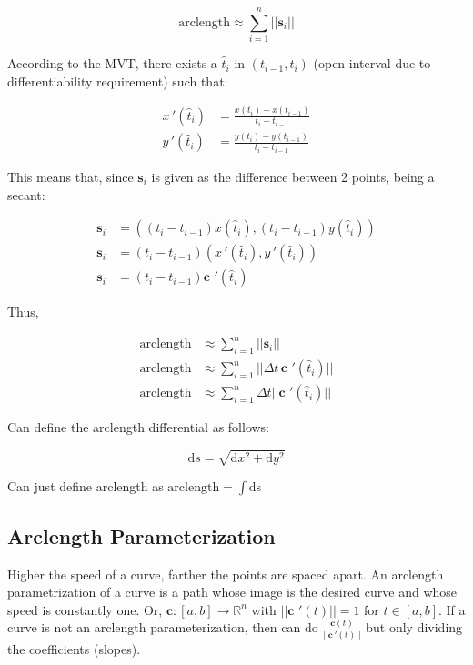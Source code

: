 \[\mbox{arclength}\approx\sum_{i=1}^n||\textbf{s}_i||\]

According to the MVT, there exists a $\hat{t}_i$ in $(t_{i-1},t_i)$ (open interval due to differentiability requirement) such that:

\begin{align*}
    x\,'(\hat{t}_i)&=\frac{x(t_i)-x(t_{i-1})}{t_i-t_{i-1}}\\
    y\,'(\hat{t}_i)&=\frac{y(t_i)-y(t_{i-1})}{t_i-t_{i-1}}
\end{align*}

This means that, since $\textbf{s}_i$ is given as the difference between 2 points,
being a secant:

\begin{align*}
    \textbf{s}_i&=\left((t_i-t_{i-1})x(\hat{t}_i), (t_i-t_{i-1})y(\hat{t}_i)\right )\\
    \textbf{s}_i&=(t_i-t_{i-1})\left(x\,'(\hat{t}_i),y\,'(\hat{t}_i)\right)\\
    \textbf{s}_i&=(t_i-t_{i-1})\textbf{c}\,\,'(\hat{t}_i)
\end{align*}

Thus,

\begin{align*}
    \mbox{arclength}&\approx\sum_{i=1}^n||\textbf{s}_i||\\
    \mbox{arclength}&\approx\sum_{i=1}^n||\Delta t \,\textbf{c}\,\,'(\hat{t}_i)||\\
    \mbox{arclength}&\approx\sum_{i=1}^n\Delta t||\textbf{c}\,\,'(\hat{t}_i)||
\end{align*}

Can define the arclength differential as follows:

\[\mathrm{d}s=\sqrt{\mathrm{d}x^2+\mathrm{d}y^2}\]

Can just define arclength as $\text{arclength}=\int \mathrm{ds}$

\subsection{Arclength Parameterization}

Higher the speed of a curve, farther the points are spaced apart.
An arclength parametrization of a curve is a path whose image is the desired curve and whose speed is constantly one.
Or, $\textbf{c}:[a,b]\to\mathbb{R}^n$ with $||\textbf{c}\,\,'(t)||=1$ for $t\in[a,b]$.
If a curve is not an arclength parameterization, then can do $\frac{\textbf{c}(t)}{||\textbf{c}\,'(t)||}$ but only dividing the coefficients (slopes).\newline

